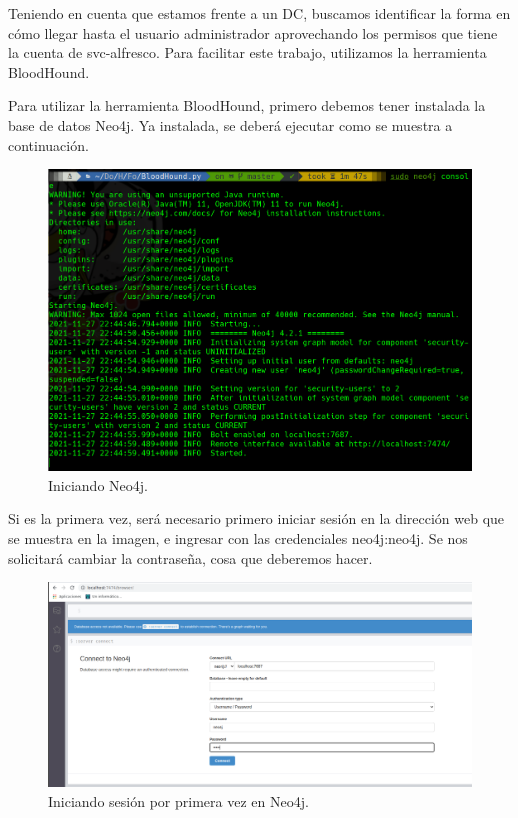 \documentclass{article}
\begin{document}
Teniendo en cuenta que estamos frente a un DC, buscamos identificar la forma en cómo llegar hasta el usuario administrador aprovechando los permisos que tiene la cuenta de svc-alfresco. Para facilitar este trabajo, utilizamos la herramienta BloodHound. 

Para utilizar la herramienta BloodHound, primero debemos tener instalada la base de datos Neo4j. Ya instalada, se deberá ejecutar como se muestra a continuación.

\begin{figure}[H]
	\center
	\includegraphics[width=\textwidth]{images/forest/iniciando_neo4j.png}
	\caption{Iniciando Neo4j.}
\end{figure}

Si es la primera vez, será necesario primero iniciar sesión en la dirección web que se muestra en la imagen, e ingresar con las credenciales neo4j:neo4j. Se nos solicitará cambiar la contraseña, cosa que deberemos hacer.


\begin{figure}[H]
	\center
	\includegraphics[width=\textwidth]{images/forest/primeraconexionNeo4j.png}
	\caption{Iniciando sesión por primera vez en Neo4j.}
\end{figure}
\end{document}
